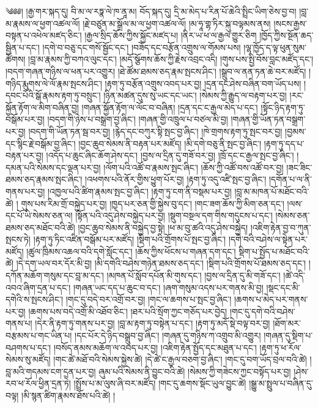 ༄༅༅། །རྒྱ་གར་སྐད་དུ། བི་མ་ལ་རཏྣ་ལེ་ཁ་ནཱ་མ། བོད་སྐད་དུ། དྲི་མ་མེད་པ་རིན་པོ་ཆེའི་སྤྲིང་ཡིག་ཅེས་བྱ་བ། །བླ་མ་རྣམས་ལ་ཕྱག་འཚལ་ལོ། །རྗེ་བཙུན་མ་སྒྲོལ་མ་ལ་ཕྱག་འཚལ་ལོ། །མ་ཧཱ་གྷ་ཏིར་སྐུ་བལྟམས་ནས། །སངས་རྒྱས་བསྟན་པ་འཕེལ་མཛད་ཅིང་། །རྒྱལ་སྲིད་ཆོས་ཀྱིས་སྐྱོང་མཛད་པ། །ནིར་ཡ་ཕ་ལ་རྒྱལ་གྱུར་ཅིག །ཁྱོད་ཀྱིས་སྔོན་ཆད་སྦྱིན་པ་དང་། །དགེ་བ་བཅུ་དང་གསོ་སྦྱོང་དང་། །བཟོད་དང་བརྩོན་འགྲུས་ལ་གོམས་པས། །ལྷ་ཁྱོད་ད་ལྟ་ཕུན་སུམ་ཚོགས། །བླ་མ་རྣམས་ཀྱི་བཀའ་ལུང་དང་། །མདོ་སྩོགས་ཆོས་ཀྱི་རྗེས་འབྲང་འདི། །གུས་པས་སྤྱི་བོས་བླང་མཛོད་དང་། །བདག་གཞན་གཉིས་ལ་ཕན་པར་འགྱུར། །ཐེ་ཚོམ་ཐམས་ཅད་རྣམ་སྤངས་ཤིང་། །སྒྲུབ་ལ་ནན་ཏན་ཆེ་བར་མཛོད། །གཉིད་རྨུགས་ལེ་ལོ་རྣམ་སྤངས་ཤིང་། །རྟག་ཏུ་བརྩོན་འགྲུས་འབད་པར་བྱ། །དྲན་དང་ཤེས་བཞིན་བག་ཡོད་པས། །དབང་པོའི་སྒོ་རྣམས་རྟག་ཏུ་བསྲུང་། །ཉིན་མཚན་དུས་སུ་ཡང་དང་ཡང་། །སེམས་ཀྱི་རྒྱུད་ལ་བརྟག་པར་བྱ། །རང་སྐྱོན་རྟོག་ལ་མིག་བཞིན་བྱ། །གཞན་སྐྱོན་རྟོག་ལ་ལོང་བ་བཞིན། །དྲན་དང་ང་རྒྱལ་མེད་པ་དང་། །སྟོང་ཉིད་རྟག་ཏུ་བསྒོམ་པར་བྱ། །བདག་གི་ཉེས་པ་བསྒྲག་བྱ་ཞིང་། །གཞན་གྱི་འཁྲུལ་པ་བཙལ་མི་བྱ། །གཞན་གྱི་ཡོན་ཏན་བསྒྲག་པར་བྱ། །བདག་གི་ཡོན་ཏན་སྦ་བར་བྱ། །རྙེད་དང་བཀུར་སྟི་སྤང་བྱ་ཞིང་། །ཁེ་གྲགས་རྟག་ཏུ་སྤང་བར་བྱ། །བྱམས་དང་སྙིང་རྗེ་བསྒོམ་བྱ་ཞིང་། །བྱང་ཆུབ་སེམས་ནི་བརྟན་པར་མཛོད། །མི་དགེ་བཅུ་ནི་སྤང་བྱ་ཞིང་། །རྟག་ཏུ་དད་པ་བརྟན་པར་བྱ། །འདོད་པ་ཆུང་ཞིང་ཆོག་ཤེས་དང་། །བྱས་ལ་དྲིན་དུ་གཟོ་བར་བྱ། །ཁྲོ་དང་ང་རྒྱལ་སྤང་བྱ་ཞིང་། །དམན་པའི་སེམས་དང་ལྡན་པར་བྱ། །ལོག་པའི་འཚོ་བ་རྣམས་སྤང་ཞིང་། །ཆོས་ཀྱི་འཚོ་བས་འཚོ་བར་བྱ། །ཟང་ཟིང་ཐམས་ཅད་རྣམས་སྤང་ཞིང་། །འཕགས་པའི་ནོར་གྱིས་ཕྱུག་པོར་བྱ། །རྟག་ཏུ་འདུ་འཛི་སྤང་བྱ་ཞིང་། །དགོན་པ་ལ་ནི་གནས་པར་བྱ། །འཁྱལ་པའི་ཚིག་རྣམས་སྤང་བྱ་ཞིང་། །རྟག་ཏུ་ངག་ནི་བསྡམ་པར་བྱ། །བླ་མ་མཁན་པོ་མཐོང་བའི་ཚེ། །
གུས་པས་རིམ་གྲོ་བསྐྱེད་པར་བྱ། །ཁྱད་པར་ཅན་གྱི་སྐྱེས་བུ་དང་། །གང་ཟག་ཆོས་ཀྱི་མིག་ཅན་དང་། །ལས་དང་པོ་ཡི་སེམས་ཅན་ལ། །སྟོན་པའི་འདུ་ཤེས་བསྐྱེད་པར་བྱ། །སྡུག་བསྔལ་དག་གིས་གདུངས་པ་དང་། །སེམས་ཅན་ཐམས་ཅད་མཐོང་བའི་ཚེ། །བྱང་ཆུབ་སེམས་ནི་བསྐྱེད་བྱ་སྟེ། །ཕ་མ་བུ་ཚའི་འདུ་ཤེས་བསྐྱེད། །འཇིག་རྟེན་བྱ་བ་ཀུན་སྤངས་ཏེ། །རྟག་ཏུ་ཏིང་འཛིན་བསྒོམ་པར་མཛོད། །སྡིག་པའི་གྲོགས་པོ་སྤང་བྱ་ཞིང་། །དགེ་བའི་བཤེས་ལ་སྟེན་པར་མཛོད། །ཚུལ་ཁྲིམས་འཆལ་བའི་དགེ་སློང་དང་། །ཆོས་ཀྱིས་ཕོངས་པ་གཞན་དག་དང་། སྡིག་པ་སྤྱོད་པ་མཐོང་བའི་ཚེ། །དེ་དག་ཡལ་བར་དོར་མི་བྱ། །མི་དགེའི་བཤེས་གཉེན་ཐམས་ཅད་དང་། །སྡིག་པའི་གྲོགས་པོ་ཐམས་ཅད་དང་། །དཀོན་མཆོག་གསུམ་དང་བླ་མ་དང་། །མཁན་པོ་སློབ་དཔོན་མི་གུས་དང་། །བྱས་ལ་དྲིན་དུ་མི་གཟོ་དང་། །ཚེ་འདི་འབའ་ཞིག་དྲན་པ་དང་། །གཞན་ཡང་དད་པ་ཆུང་བ་དང་། །ཞག་གསུམ་འདས་པར་གནས་མི་བྱ། །སྡང་དང་མི་དགེའི་ས་སྤངས་ཤིང་། །གང་དུ་བདེ་བར་འགྲོ་བར་བྱ། །གང་ལ་ཆགས་པ་སྤང་བྱ་ཞིང་། །ཆགས་པ་མེད་པར་གནས་པར་བྱ། །ཆགས་པས་བདེ་འགྲོ་མི་འཐོབ་ཅིང་། །ཐར་པའི་སྲོག་ཀྱང་གཅོད་པར་བྱེད། །གང་དུ་དགེ་བའི་བཤེས་གནས་པ། །དེར་ནི་རྟག་ཏུ་གནས་པར་བྱ། །བླ་མ་རྟག་ཏུ་བསྟེན་པ་དང་། །རྟག་ཏུ་མདོ་སྡེ་བལྟ་བར་བྱ། །ཐོག་མར་བརྩམས་པ་གང་ཡིན་པ། །དང་པོར་དེ་ཉིད་བསྒྲུབ་བྱ་ཞིང་། །གཞན་དུ་གཉིས་ཀ་འགྲུབ་མི་འགྱུར། །གཞན་དུ་སྡིག་པ་བཤགས་པ་དང་། །བསོད་ནམས་མཆོག་ལ་འབད་པར་བྱ། །འཇིག་རྟེན་སྤྱོད་དང་མཐུན་པ་དང་། །རྟག་ཏུ་ཕ་རོལ་སེམས་སུ་མཛོད། །གང་ཚེ་མཐོ་བའི་སེམས་སྐྱེས་ཚེ། །དེ་ཚེ་ང་རྒྱལ་བཅག་བྱ་ཞིང་། །གང་དུ་བག་ཡོད་བྲལ་བའི་ཚེ། །བླ་མའི་གདམས་ངག་དྲན་པར་བྱ། ཞུམ་པའི་སེམས་ནི་བྱུང་བའི་ཚེ། །སེམས་ཀྱི་གཟེངས་ཀྱང་བསྟོད་པར་བྱ། །ཤེས་རབ་ཕ་རོལ་ཕྱིན་དྲན་ཏེ། །སྤྲོས་པ་མ་ལུས་ཞི་བར་མཛོད། །གང་དུ་ཆགས་སྡོང་ཡུལ་བྱུང་ཚེ། །སྒྱུ་མ་སྤྲུལ་པ་བཞིན་དུ་བལྟ། །མི་སྙན་ཚིག་རྣམས་ཐོས་པའི་ཚེ། །
